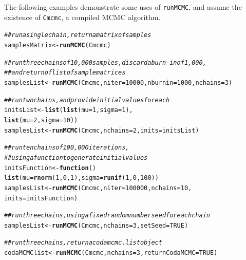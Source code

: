 \documentclass[12pt,oneside]{book}\usepackage[]{graphicx}\usepackage[]{color}
\makeatletter
\newcommand{\hlnum}[1]{\textcolor[rgb]{0.686,0.059,0.569}{#1}}%
\newcommand{\hlcom}[1]{\textcolor[rgb]{0.678,0.584,0.686}{\textit{#1}}}%
\newcommand{\hlstd}[1]{\textcolor[rgb]{0.345,0.345,0.345}{#1}}%
\newcommand{\hlkwa}[1]{\textcolor[rgb]{0.161,0.373,0.58}{\textbf{#1}}}%
\newcommand{\hlkwb}[1]{\textcolor[rgb]{0.69,0.353,0.396}{#1}}%
\newcommand{\hlkwc}[1]{\textcolor[rgb]{0.333,0.667,0.333}{#1}}%
\newcommand{\hlkwd}[1]{\textcolor[rgb]{0.737,0.353,0.396}{\textbf{#1}}}%
\newenvironment{kframe}{%
 \def\at@end@of@kframe{}%
 \ifinner\ifhmode%
  \def\at@end@of@kframe{\end{minipage}}%
  \begin{minipage}{\columnwidth}%
 \fi\fi%
 \def\FrameCommand##1{\hskip\@totalleftmargin \hskip-\fboxsep
 \colorbox{shadecolor}{##1}\hskip-\fboxsep
     \hskip-\linewidth \hskip-\@totalleftmargin \hskip\columnwidth}%
 \MakeFramed {\advance\hsize-\width
   \@totalleftmargin\z@ \linewidth\hsize
   \@setminipage}}%
 {\par\unskip\endMakeFramed%
 \at@end@of@kframe}
\newenvironment{knitrout}{}{} %
\def\cd#1{\texttt{#1}}
\makeatother
\begin{document}
The following examples demonstrate some uses of \cd{runMCMC}, and assume the existence of \cd{Cmcmc}, a compiled MCMC algorithm.

\begin{knitrout}
\color{fgcolor}\begin{kframe}
\begin{alltt}
\hlcom{## run a single chain, return a matrix of samples}
\hlstd{samplesMatrix} \hlkwb{<-} \hlkwd{runMCMC}\hlstd{(Cmcmc)}

\hlcom{## run three chains of 10,000 samples, discard a burn-in of 1,000,}
\hlcom{## and return of list of sample matrices}
\hlstd{samplesList} \hlkwb{<-} \hlkwd{runMCMC}\hlstd{(Cmcmc,} \hlkwc{niter} \hlstd{=} \hlnum{10000}\hlstd{,} \hlkwc{nburnin} \hlstd{=} \hlnum{1000}\hlstd{,} \hlkwc{nchains} \hlstd{=} \hlnum{3}\hlstd{)}

\hlcom{## run two chains, and provide initial values for each}
\hlstd{initsList} \hlkwb{<-} \hlkwd{list}\hlstd{(}\hlkwd{list}\hlstd{(}\hlkwc{mu} \hlstd{=} \hlnum{1}\hlstd{,} \hlkwc{sigma} \hlstd{=} \hlnum{1}\hlstd{),}
                  \hlkwd{list}\hlstd{(}\hlkwc{mu} \hlstd{=} \hlnum{2}\hlstd{,} \hlkwc{sigma} \hlstd{=} \hlnum{10}\hlstd{))}
\hlstd{samplesList} \hlkwb{<-} \hlkwd{runMCMC}\hlstd{(Cmcmc,} \hlkwc{nchains} \hlstd{=} \hlnum{2}\hlstd{,} \hlkwc{inits} \hlstd{= initsList)}

\hlcom{## run ten chains of 100,000 iterations,}
\hlcom{## using a function to generate initial values}
\hlstd{initsFunction} \hlkwb{<-} \hlkwa{function}\hlstd{()}
    \hlkwd{list}\hlstd{(}\hlkwc{mu} \hlstd{=} \hlkwd{rnorm}\hlstd{(}\hlnum{1}\hlstd{,}\hlnum{0}\hlstd{,}\hlnum{1}\hlstd{),} \hlkwc{sigma} \hlstd{=} \hlkwd{runif}\hlstd{(}\hlnum{1}\hlstd{,}\hlnum{0}\hlstd{,}\hlnum{100}\hlstd{))}
\hlstd{samplesList} \hlkwb{<-} \hlkwd{runMCMC}\hlstd{(Cmcmc,} \hlkwc{niter} \hlstd{=} \hlnum{100000}\hlstd{,} \hlkwc{nchains} \hlstd{=} \hlnum{10}\hlstd{,}
                       \hlkwc{inits} \hlstd{= initsFunction)}

\hlcom{## run three chains, using a fixed random number seed for each chain}
\hlstd{samplesList} \hlkwb{<-} \hlkwd{runMCMC}\hlstd{(Cmcmc,} \hlkwc{nchains} \hlstd{=} \hlnum{3}\hlstd{,} \hlkwc{setSeed} \hlstd{=} \hlnum{TRUE}\hlstd{)}

\hlcom{## run three chains, return a coda mcmc.list object}
\hlstd{codaMCMClist} \hlkwb{<-} \hlkwd{runMCMC}\hlstd{(Cmcmc,} \hlkwc{nchains} \hlstd{=} \hlnum{3}\hlstd{,} \hlkwc{returnCodaMCMC} \hlstd{=} \hlnum{TRUE}\hlstd{)}
\end{alltt}
\end{kframe}
\end{knitrout}
\end{document}
